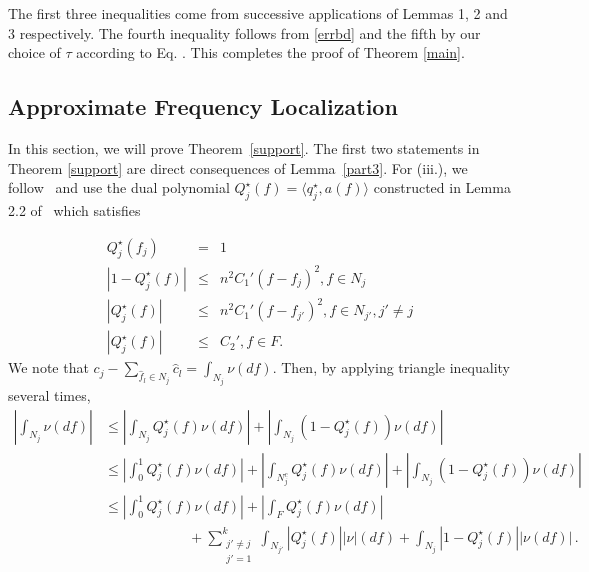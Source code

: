 The first three inequalities come from successive applications of Lemmas 1, 2
and 3 respectively. The fourth inequality follows from \eqref{errbd} and the
fifth by our choice of $\tau$ according to Eq. . This completes the
proof of Theorem \ref{main}.

\subsection{Approximate Frequency Localization}
\label{sec:support}

In this section, we will prove Theorem~\ref{support}. The first two statements
in Theorem \ref{support} are direct consequences of Lemma~\ref{part3}. For
(iii.), we follow~\cite{granda2} and use the dual polynomial $Q_j^{\star} ( f) =
\langle q_j^{\star}, a ( f)\rangle$ constructed in Lemma 2.2 of~\cite{granda2}
which satisfies

\begin{eqnarray*}
  Q_j^{\star} ( f_j) & = & 1\\
  | 1 - Q_j^{\star} ( f) | & \leq & n^2 C_1' ( f - f_j)^2, f \in N_j\\
  | Q_j^{\star} ( f) | & \leq & n^2 C_1' ( f - f_{j'})^2, f \in N_{j'}, j' \neq
  j\\
  | Q_j^{\star} ( f) | & \leq & C_2', f \in F.
\end{eqnarray*}
We note that $c_j - \sum_{\hat{f}_l \in N_j} \hat{c}_l = \int_{N_j} \nu(df)$. Then, by applying triangle inequality several times,
\begin{align*}
\left| \int_{N_j}  \nu(df)\right|
& \leq \left| \int_{N_j}  Q_j^\star (f) \nu(df)\right| + \left| \int_{N_j}  (1-Q_j^\star (f)) \nu(df)\right|\\
& \leq \left| \int_0^1  Q_j^\star (f) \nu(df)\right| + \left| \int_{N_j^c}  Q_j^\star (f) \nu(df)\right| + \left| \int_{N_j}  (1-Q_j^\star (f)) \nu(df)\right|\\
& \leq \left|\int_0^1  Q_j^\star (f) \nu(df)\right| + \left| \int_{F}  Q_j^\star (f) \nu(df)\right| \\
&\qquad\qquad\qquad + \sum_{\substack{j' \neq j\\j'=1}}^k \int_{N_{j'}} \left| Q_j^\star (f)\right| |\nu|(df) +  \int_{N_j}  \left|1-Q_j^\star (f)\right| |\nu(df)|\,.
\end{align*}

